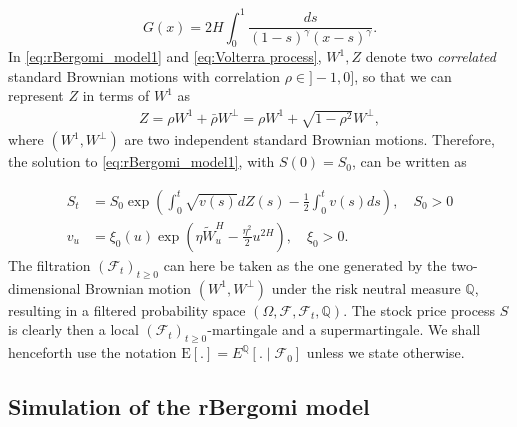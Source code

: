 \documentclass[11pt]{article}
\newcommand{\expt}[1]{\mathrm{E}\left[#1\right]}
\newcommand{\PERIOD}{.}
\begin{document}
  \begin{equation*}
G(x)=2H \int_{0}^1 \frac{ds}{(1-s)^{\gamma} (x-s)^{\gamma}}.
 \end{equation*}
In \eqref{eq:rBergomi_model1} and \eqref{eq:Volterra process}, $W^1, Z$ denote two \emph{correlated} standard Brownian motions with correlation $\rho \in ]-1,0]$, so that we can represent $Z$ in terms of $W^1$ as
\begin{align*}
	Z=\rho	W^1+ \bar{\rho}W^\perp = \rho W^1+\sqrt{1-\rho^2} W^\perp,
\end{align*}
where $(W^1,W^\perp)$ are two independent standard Brownian motions.
Therefore, the solution to \eqref{eq:rBergomi_model1}, with $S(0)=S_0$, can be written as 

\begin{align}\label{eq:rBergomi_model}
	S_t&= S_0  \operatorname{exp}\left( \int_{0}^{t} \sqrt{v(s)} dZ(s)- \frac{1}{2} \int_{0}^{t} v(s) ds   \right),\quad S_0>0 \nonumber\\
	v_u&=\xi_0(u) \operatorname{exp}\left( \eta \widetilde{W}_u^H- \frac{\eta^2}{2} u^{2H} \right), \quad \xi_0>0 \PERIOD
\end{align}
The filtration $(\mathcal{F}_t)_{t\ge 0}$ can here be taken as the one generated by the two-dimensional Brownian motion $(W^1,W^\perp)$ under the risk neutral measure $\mathbb{Q}$, resulting in  a filtered probability space $(\Omega,\mathcal{F}, \mathcal{F}_t,\mathbb{Q})$. The stock price process $S$ is clearly then a local
$(\mathcal{F}_t)_{t\ge 0}$-martingale and a supermartingale.  We shall henceforth use the notation $\expt{.} = E^{\mathbb{Q}}\left[. \mid \mathcal{F}_0\right]$ unless we state otherwise.




\subsection{Simulation of the rBergomi model}\label{sec:Simulation of the rBergomi model}
\end{document}
